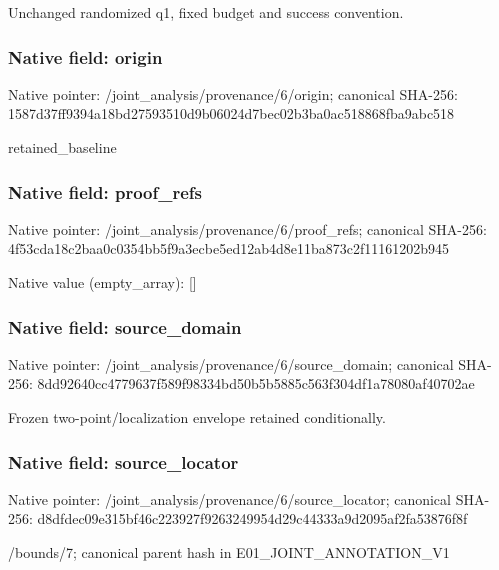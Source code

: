\documentclass[10pt,a4paper]{article}
\begin{document}
\begingroup\raggedright\sloppy Unchanged randomized q1,\allowbreak{} fixed budget and success convention.\par\endgroup

\subsubsection{Native field: origin}
Native pointer: /joint\_\allowbreak{}analysis/provenance/6/origin; canonical SHA-256: 1587d37ff9394a18bd27593510d9b06024d7bec02b3ba0ac518868fba9abc518

\begingroup\raggedright\sloppy retained\_\allowbreak{}baseline\par\endgroup

\subsubsection{Native field: proof\_\allowbreak{}refs}
Native pointer: /joint\_\allowbreak{}analysis/provenance/6/proof\_\allowbreak{}refs; canonical SHA-256: 4f53cda18c2baa0c0354bb5f9a3ecbe5ed12ab4d8e11ba873c2f11161202b945

Native value (empty\_\allowbreak{}array): []

\subsubsection{Native field: source\_\allowbreak{}domain}
Native pointer: /joint\_\allowbreak{}analysis/provenance/6/source\_\allowbreak{}domain; canonical SHA-256: 8dd92640cc4779637f589f98334bd50b5b5885c563f304df1a78080af40702ae

\begingroup\raggedright\sloppy Frozen two-point/\allowbreak{}localization envelope retained conditionally.\par\endgroup

\subsubsection{Native field: source\_\allowbreak{}locator}
Native pointer: /joint\_\allowbreak{}analysis/provenance/6/source\_\allowbreak{}locator; canonical SHA-256: d8dfdec09e315bf46c223927f9263249954d29c44333a9d2095af2fa53876f8f

\begingroup\raggedright\sloppy /\allowbreak{}bounds/\allowbreak{}7;\allowbreak{} canonical parent hash in E01\_\allowbreak{}JOINT\_\allowbreak{}ANNOTATION\_\allowbreak{}V1\par\endgroup
\end{document}
